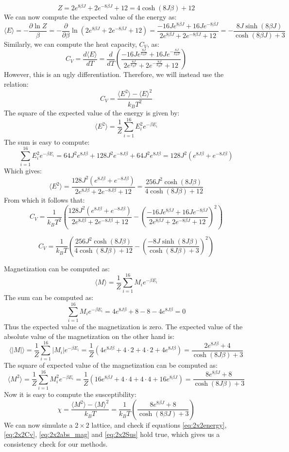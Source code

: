 \documentclass[a4paper, 10pt]{article}
\begin{document}
$$Z=2e^{8\beta J}+2e^{-8\beta J} + 12=4\cosh (8J\beta) +12$$
We can now compute the expected value of the energy as:
\begin{equation}\label{eq:2x2energy}
\langle E \rangle =  -\frac{\partial \ln Z}{\beta}=-\frac{\partial}{\partial \beta}\ln\left(2e^{8\beta J}+2e^{-8\beta J}+12\right)=\frac{-16Je^{8\beta J}+16Je^{-8\beta J}}{2e^{8\beta J}+2e^{-8\beta J}+12}=-\frac{8J\sinh(8\beta J)}{\cosh(8\beta J)+3}
\end{equation}
Similarly, we can compute the heat capacity, $C_V$, as:
$$C_V=\frac{d\langle E \rangle}{dT}=\frac{d}{dT}\left(\frac{-16Je^{\frac{8J}{k_BT}}+16Je^{-\frac{8J}{k_BT}}}{2e^{\frac{8J}{k_BT}}+2e^{-\frac{8J}{k_BT}}+12}\right)$$
However, this is an ugly differentiation. Therefore, we will instead use the relation:
$$C_V=\frac{\langle E^2 \rangle - \langle E \rangle^2}{k_BT^2}$$
The square of the expected value of the energy is given by:
$$\langle E^2\rangle=\frac{1}{Z} \sum_{i=1}^ {16}E_i^2e^{-\beta E_i}$$
The sum is easy to compute:
$$\sum_{i=1}^{16}E_i^2e^{-\beta E_i}=64J^2e^{8J\beta}+128J^2e^{-8J\beta}+64J^2e^{8J\beta}=128J^2\left(e^{8J\beta}+e^{-8J\beta}\right)$$
Which gives:
$$\langle E^2\rangle = \frac{128J^2\left(e^{8J\beta}+e^{-8J\beta}\right)}{2e^{8J\beta}+2e^{-8J\beta}+12}=\frac{256J^2\cosh(8J\beta)}{4\cosh(8J\beta)+12}$$
From which it follows that:
$$C_V=\frac{1}{k_BT^2}\left(\frac{128J^2\left(e^{8J\beta}+e^{-8J\beta}\right)}{2e^{8J\beta}+2e^{-8J\beta}+12}-\left(\frac{-16Je^{8\beta J}+16Je^{-8\beta J}}{2e^{8\beta J}+2e^{-8\beta J}+12}\right)^2\right)$$

\begin{equation}\label{eq:2x2Cv}
C_V=\frac{1}{k_BT}\left(\frac{256J^2\cosh(8J\beta)}{4\cosh(8J\beta)+12}-\left(\frac{-8J\sinh(8J\beta)}{\cosh(8J\beta)+3}\right)^2\right)
\end{equation}

Magnetization can be computed as:
$$\langle M \rangle=\frac{1}{Z}\sum_{i=1}^{16}M_ie^{-\beta E_i}$$
The sum can be computed as:
$$\sum_{i=1}^{16}M_ie^{-\beta E_i}=4e^{8J\beta}+8-8-4e^{8J\beta}=0$$
Thus the expected value of the magnetization is zero. The expected value of the absolute value of the magnetization on the other hand is:
\begin{equation}\label{eq:2x2abs_mag}
\langle |M|\rangle =\frac{1}{Z}\sum_{i=1}^{16}|M_i|e^{-\beta E_i}=\frac{1}{Z}\left( 4e^{8J\beta}+4\cdot 2+ 4\cdot 2 +4e^{8J\beta}\right)=\frac{2e^{8J\beta}+4}{\cosh(8J\beta)+3}
\end{equation}
The square of expected value of the magnetization can be computed as:
$$\langle M^2 \rangle = \frac{1}{Z}\sum_{i=1}^{16}M_i^2e^{-\beta E_i}=\frac{1}{Z}\left(16e^{8\beta J}+4\cdot 4+4\cdot 4+16e^{8\beta J}\right)=\frac{8e^{8\beta J}+8}{\cosh(8J\beta)+3}$$
Now it is easy to compute the susceptibility:
\begin{equation}\label{eq:2x2Sus}
\chi = \frac{\langle M^2\rangle - \langle M \rangle^2}{k_BT}=\frac{1}{k_BT}\left(\frac{8e^{8\beta J}+8}{\cosh(8\beta J)+3}\right)
\end{equation}
We can now simulate a $2\times 2$ lattice, and check if equations \ref{eq:2x2energy}, \ref{eq:2x2Cv}, \ref{eq:2x2abs_mag} and \ref{eq:2x2Sus} hold true, which gives us a consistency check for our methods.
\end{document}
